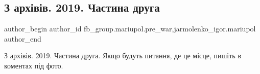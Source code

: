  
 
 
 
 

\subsection{З архівів. 2019. Частина друга}
\label{sec:07_02_2023.fb.fb_group.mariupol.pre_war.5.z_arkh_v_v__2019__ch}
 
\ifcmt
 author_begin
   author_id fb_group.mariupol.pre_war,jarmolenko_igor.mariupol
 author_end
\fi

З архівів. 2019. Частина друга. Якщо будуть питання, де це місце, пишіть в
коментах під фото.
